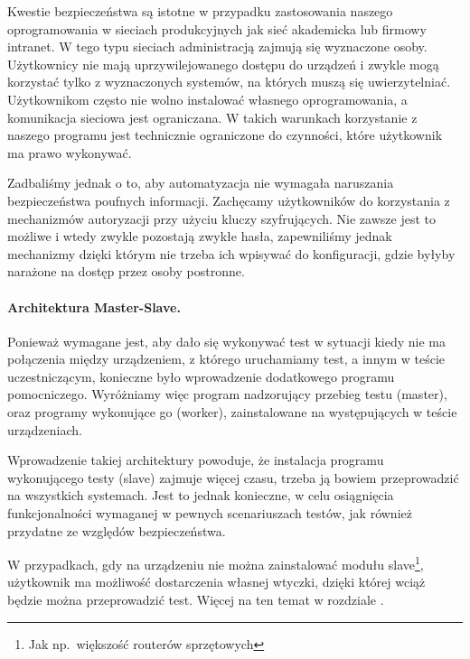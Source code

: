 \documentclass[00-praca-magisterska.tex]{subfiles}
\begin{document}
Kwestie bezpieczeństwa są istotne w przypadku zastosowania naszego
oprogramowania w sieciach produkcyjnych jak sieć akademicka lub firmowy
intranet. W tego typu sieciach administracją zajmują się wyznaczone osoby.
Użytkownicy nie mają uprzywilejowanego dostępu do urządzeń i zwykle mogą
korzystać tylko z wyznaczonych systemów, na których muszą się uwierzytelniać.
Użytkownikom często nie wolno instalować własnego oprogramowania, a komunikacja
sieciowa jest ograniczana. W takich warunkach korzystanie z naszego programu
jest technicznie ograniczone do czynności, które użytkownik ma prawo wykonywać. 

Zadbaliśmy jednak o to, aby automatyzacja nie wymagała naruszania
bezpieczeństwa poufnych informacji. Zachęcamy użytkowników do korzystania z
mechanizmów autoryzacji przy użyciu kluczy szyfrujących. Nie zawsze jest to
możliwe i wtedy zwykle pozostają zwykłe hasła, zapewniliśmy jednak mechanizmy
dzięki którym nie trzeba ich wpisywać do konfiguracji, gdzie byłyby narażone na
dostęp przez osoby postronne.

\paragraph{Architektura Master-Slave.} Ponieważ wymagane jest, aby dało się
wykonywać test w sytuacji kiedy nie ma połączenia między urządzeniem, z którego
uruchamiamy test, a innym w teście uczestniczącym, konieczne było wprowadzenie
dodatkowego programu pomocniczego. Wyróżniamy więc program nadzorujący
przebieg testu (master), oraz programy wykonujące go (worker), zainstalowane na
występujących w teście urządzeniach.

Wprowadzenie takiej architektury powoduje, że instalacja programu wykonującego
testy (slave) zajmuje więcej czasu, trzeba ją bowiem przeprowadzić na
wszystkich systemach. Jest to jednak konieczne, w celu osiągnięcia
funkcjonalności wymaganej w pewnych scenariuszach testów, jak również przydatne
ze względów bezpieczeństwa.

W przypadkach, gdy na urządzeniu nie można zainstalować modułu
slave\footnote{Jak np.~większość routerów sprzętowych}, użytkownik ma możliwość
dostarczenia własnej wtyczki, dzięki której wciąż będzie można przeprowadzić
test. Więcej na ten temat w rozdziale .

%
%
\end{document}
